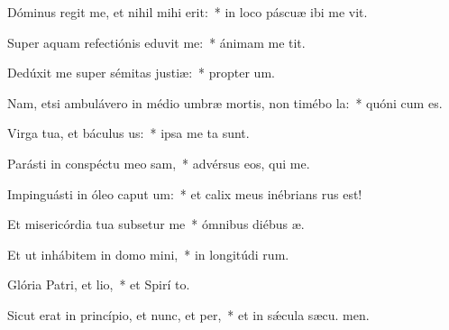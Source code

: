 \item Dóminus regit me, et nihil mihi erit:~* in loco páscuæ ibi me vit.
\item Super aquam refectiónis eduvit me:~* ánimam me tit.
\item Dedúxit me super sémitas justiæ:~* propter  um.
\item Nam, etsi ambulávero in médio umbræ mortis, non timébo la:~* quóni  cum es.
\item Virga tua, et báculus us:~* ipsa me ta sunt.
\item Parásti in conspéctu meo sam,~* advérsus eos, qui  me.
\item Impinguásti in óleo caput um:~* et calix meus inébrians  rus est!
\item Et misericórdia tua subsetur me~* ómnibus diébus  æ.
\item Et ut inhábitem in domo mini,~* in longitúdi rum.
\item Glória Patri, et lio,~* et Spirí to.
\item Sicut erat in princípio, et nunc, et per,~* et in sǽcula sæcu. men.
